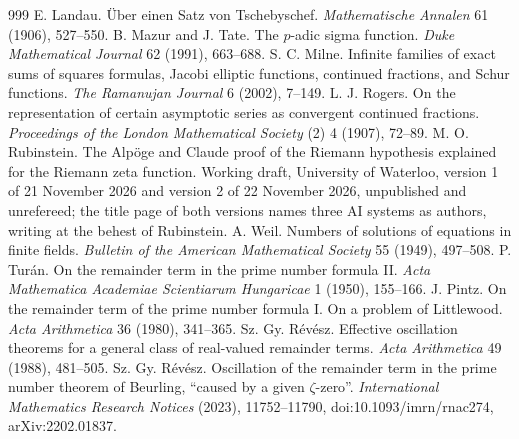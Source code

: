 \begin{thebibliography}{999}
 E. Landau. \"Uber einen Satz von Tschebyschef. \emph{Mathematische Annalen} 61 (1906), 527--550.
 B. Mazur and J. Tate. The $p$-adic sigma function. \emph{Duke Mathematical Journal} 62 (1991), 663--688.
 S. C. Milne. Infinite families of exact sums of squares formulas, Jacobi elliptic functions, continued fractions, and Schur functions. \emph{The Ramanujan Journal} 6 (2002), 7--149.
 L. J. Rogers. On the representation of certain asymptotic series as convergent continued fractions. \emph{Proceedings of the London Mathematical Society} (2) 4 (1907), 72--89.
 M. O. Rubinstein. The Alp\"oge and Claude proof of the Riemann hypothesis explained for the Riemann zeta function. Working draft, University of Waterloo, version 1 of 21 November 2026 and version 2 of 22 November 2026, unpublished and unrefereed; the title page of both versions names three AI systems as authors, writing at the behest of Rubinstein.
 A. Weil. Numbers of solutions of equations in finite fields. \emph{Bulletin of the American Mathematical Society} 55 (1949), 497--508.
 P. Tur\'an. On the remainder term in the prime number formula II. \emph{Acta Mathematica Academiae Scientiarum Hungaricae} 1 (1950), 155--166.
 J. Pintz. On the remainder term of the prime number formula I. On a problem of Littlewood. \emph{Acta Arithmetica} 36 (1980), 341--365.
 Sz. Gy. R\'ev\'esz. Effective oscillation theorems for a general class of real-valued remainder terms. \emph{Acta Arithmetica} 49 (1988), 481--505.
 Sz. Gy. R\'ev\'esz. Oscillation of the remainder term in the prime number theorem of Beurling, ``caused by a given $\zeta$-zero''. \emph{International Mathematics Research Notices} (2023), 11752--11790, doi:10.1093/imrn/rnac274, arXiv:2202.01837.

\end{thebibliography}
